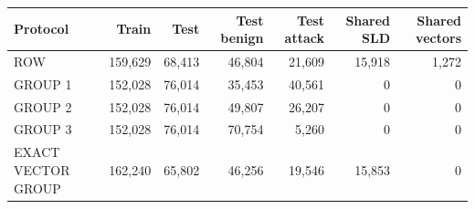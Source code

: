 \centering\footnotesize
\begin{tabular}{@{}lrrrrrr@{}}
\toprule
Protocol & Train & Test & Test benign & Test attack & Shared SLD & Shared vectors\\\midrule
ROW & 159,629 & 68,413 & 46,804 & 21,609 & 15,918 & 1,272\\
GROUP 1 & 152,028 & 76,014 & 35,453 & 40,561 & 0 & 0\\
GROUP 2 & 152,028 & 76,014 & 49,807 & 26,207 & 0 & 0\\
GROUP 3 & 152,028 & 76,014 & 70,754 & 5,260 & 0 & 0\\
EXACT VECTOR GROUP & 162,240 & 65,802 & 46,256 & 19,546 & 15,853 & 0\\
\bottomrule
\end{tabular}
